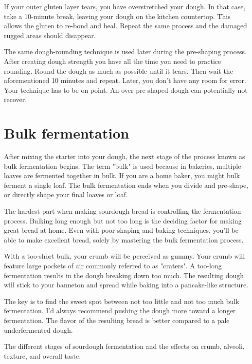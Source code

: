 If your outer gluten layer tears, you have overstretched your dough. In
that case, take a 10-minute break, leaving your dough on the kitchen countertop.
This allows the gluten to re-bond and heal. Repeat the same process
and the damaged rugged areas should disappear.

The same dough-rounding technique is used later during
the pre-shaping process. After creating dough strength you
have all the time you need to practice rounding. Round the dough
as much as possible until it tears. Then wait the aforementioned 10 minutes and repeat.
Later, you don't have any room for error. Your technique has to be on point.
An over-pre-shaped dough can potentially not recover.

\section{Bulk fermentation}
\label{section:bulk-fermentation}

After mixing the starter into your dough, the next stage of
the process known as bulk fermentation begins. The term
"bulk" is used because in bakeries, multiple loaves are fermented
together in bulk. If you are a home baker, you might bulk
ferment a single loaf. The bulk fermentation ends when you
divide and pre-shape, or directly shape your final loaves or loaf.

The hardest part when making sourdough bread is controlling
the fermentation process. Bulking long enough but not too
long is the deciding factor for making great bread at home.
Even with poor shaping and baking techniques, you'll be able
to make excellent bread, solely by mastering the bulk
fermentation process.

With a too-short bulk, your crumb will be
perceived as gummy. Your crumb will feature large pockets of
air commonly referred to as "craters". A too-long fermentation
results in the dough breaking down too much. The resulting
dough will stick to your banneton and spread while baking
into a pancake-like structure.

The key is to find the sweet spot between not too little
and not too much bulk fermentation. I'd always recommend pushing
the dough more toward a longer fermentation. The
flavor of the resulting bread is better compared to a pale
underfermented dough.

\begin{table}[!htb]
    \begin{center}
        
        \caption{The different stages of sourdough fermentation and the
        effects on crumb, alveoli, texture, and overall taste.}
    \end{center}
\end{table}

